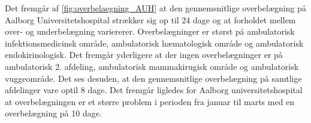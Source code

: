 \noindent
Det fremgår af \autoref{fig:overbelaegning_AUH} at den gennemsnitlige overbelægning på Aalborg Universitetshospital strækker sig op til 24 dage og at forholdet mellem over- og underbelægning variererer. Overbelægninger er størst på ambulatorisk infektionsmedicinsk område, ambulatorisk hæmatologisk område og ambulatorisk endokirinologisk. Det fremgår yderligere at der ingen overbelægninger er på ambulatorisk 2. afdeling, ambulatorisk mammakirugisk  område og ambulatorisk vuggeområde. Det ses desuden, at den gennemsnitlige overbelægning på samtlige afdelinger vare optil 8 dage. Det fremgår ligledes for Aalborg universitetshospital at overbelægningen er et større problem i perioden fra januar til marts med en overbelægning på 10 dage.    





